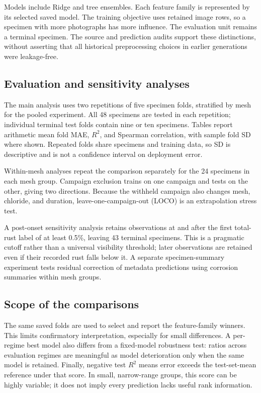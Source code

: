 \documentclass[conference]{IEEEtran}
\begin{document}
Models include Ridge and tree ensembles. Each feature family is represented by its selected saved model. The training objective uses retained image rows, so a specimen with more photographs has more influence. The evaluation unit remains a terminal specimen. The source and prediction audits support these distinctions, without asserting that all historical preprocessing choices in earlier generations were leakage-free.

\subsection{Evaluation and sensitivity analyses}
The main analysis uses two repetitions of five specimen folds, stratified by mesh for the pooled experiment. All 48 specimens are tested in each repetition; individual terminal test folds contain nine or ten specimens. Tables report arithmetic mean fold MAE, $R^2$, and Spearman correlation, with sample fold SD where shown. Repeated folds share specimens and training data, so SD is descriptive and is not a confidence interval on deployment error.

Within-mesh analyses repeat the comparison separately for the 24 specimens in each mesh group. Campaign exclusion trains on one campaign and tests on the other, giving two directions. Because the withheld campaign also changes mesh, chloride, and duration, leave-one-campaign-out (LOCO) is an extrapolation stress test.

A post-onset sensitivity analysis retains observations at and after the first total-rust label of at least 0.5\%, leaving 43 terminal specimens. This is a pragmatic cutoff rather than a universal visibility threshold; later observations are retained even if their recorded rust falls below it. A separate specimen-summary experiment tests residual correction of metadata predictions using corrosion summaries within mesh groups.

\subsection{Scope of the comparisons}
The same saved folds are used to select and report the feature-family winners. This limits confirmatory interpretation, especially for small differences. A per-regime best model also differs from a fixed-model robustness test: ratios across evaluation regimes are meaningful as model deterioration only when the same model is retained. Finally, negative test $R^2$ means error exceeds the test-set-mean reference under that score. In small, narrow-range groups, this score can be highly variable; it does not imply every prediction lacks useful rank information.
\end{document}
